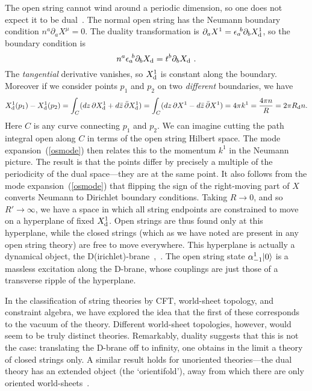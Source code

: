 The open string cannot wind around a periodic dimension, so one
does not expect it to be dual~\cite{DLP}.  The normal open string has
the Neumann boundary condition $n^a \partial_a X^\mu = 0$.  The
duality transformation is $\partial_a X^1 = \epsilon_a\!^b \partial_b
X^1_{\rm d}$, so the boundary condition is
\begin{equation}
n^a \epsilon_a\!^b \partial_b X_{\rm d} = t^b \partial_b X_{\rm d}\ .
\end{equation}
The {\it tangential} derivative vanishes, so $X^1_{\rm d}$ is constant
along the boundary.  Moreover if we consider points $p_1$ and
$p_2$ on two {\it different} boundaries, we have
\begin{equation}
X^1_{\rm d}(p_1) - X^1_{\rm d}(p_2) = \int_C 
(dz \,\partial X^1_{\rm d} + 
d\bar z\, \bar\partial X^1_{\rm d}) = \int_C (dz \,\partial X^1 - 
d\bar z\, \bar\partial X^1) = 4\pi k^1 = \frac{4\pi n}{R} = 2\pi
R_{\rm d} n.
\end{equation}
Here $C$ is any curve connecting $p_1$ and $p_2$.  We can imagine
cutting the path integral open along $C$ in terms of the open
string Hilbert space.  The mode expansion~(\ref{osmode}) then
relates this to the momentum $k^1$ in the Neumann picture.  The result
is that the points differ by precisely a multiple of the
periodicity of the dual space---they are at the same point.
It also follows from the mode expansion~(\ref{osmode})
that flipping the sign of the right-moving part of $X$ converts
Neumann to Dirichlet boundary conditions.
Taking $R \to 0$, and so $R' \to\infty$, we have a space in which all
string endpoints are constrained to move on a hyperplane of fixed
$X^1_{\rm d}$.  Open strings are thus found only at this hyperplane,
while
the closed strings (which as we have noted are present in any open
string theory) are free to move everywhere.
This
hyperplane is actually a dynamical object, the
D(irichlet)-brane~\cite{DLP},~\cite{Ldir}. The open string state
$\alpha^1_{-1}\mbox{$| 0 \rangle$}$ is a massless excitation along the D-brane,
whose couplings are just those of a transverse ripple of the
hyperplane.

In the classification of string theories by CFT,
world-sheet topology, and constraint algebra, we have
explored the idea that the first of these corresponds to
the vacuum of the theory.  Different world-sheet topologies,
however, would seem to be truly distinct theories.  Remarkably,
duality suggests that this is not the case: translating the
D-brane off to infinity, one obtains in the limit a theory of
closed strings only.  A similar result holds for unoriented
theories---the dual theory has an extended object (the
`orientifold'), away from which there are only oriented
world-sheets~\cite{DLP}.

